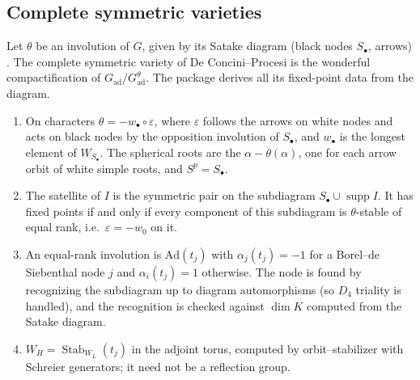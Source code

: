 \documentclass[11pt]{amsart}
\theoremstyle{definition}
\theoremstyle{remark}
\DeclareMathOperator{\supp}{supp}
\DeclareMathOperator{\Stab}{Stab}
\begin{document}
\subsection{Complete symmetric varieties}\label{subsec:symmetric}
Let $\theta$ be an involution of $G$, given by its Satake diagram (black
nodes $S_\bullet$, arrows) \cite{Araki}. The complete symmetric variety of
De Concini--Procesi \cite{DCP83} is the wonderful compactification of
$G_{\mathrm{ad}}/G_{\mathrm{ad}}^\theta$. The package derives all its
fixed-point data from the diagram.
\begin{enumerate}
\item On characters $\theta = -w_\bullet\circ\varepsilon$, where $\varepsilon$
follows the arrows on white nodes and acts on black nodes by the opposition
involution of $S_\bullet$, and $w_\bullet$ is the longest element of
$W_{S_\bullet}$. The spherical roots are the $\alpha-\theta(\alpha)$, one for
each arrow orbit of white simple roots, and $S^p = S_\bullet$.
\item The satellite of $I$ is the symmetric pair on the subdiagram
$S_\bullet\cup\supp I$. It has fixed points if and only if every component
of this subdiagram is $\theta$-stable of equal rank, i.e.\ $\varepsilon=-w_0$
on it.
\item An equal-rank involution is $\mathrm{Ad}(t_j)$ with $\alpha_j(t_j)=-1$
for a Borel--de Siebenthal node $j$ \cite{BorelDeSiebenthal} and
$\alpha_i(t_j)=1$ otherwise. The node is found by recognizing the
subdiagram up to diagram automorphisms (so $D_4$ triality is handled),
and the recognition is checked against $\dim K$ computed from the Satake
diagram.
\item $W_H = \Stab_{W_L}(t_j)$ in the adjoint torus, computed by
orbit--stabilizer with Schreier generators; it need not be a reflection
group.
\end{enumerate}
\end{document}
